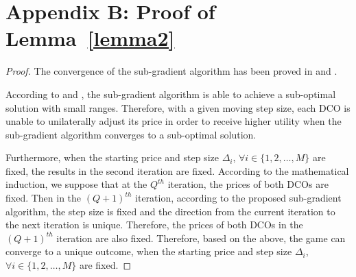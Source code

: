 \documentclass[twocolumn,10pt]{IEEEtran}
\newtheorem{proof}{Proof}
\begin{document}
\section*{Appendix B: Proof of Lemma~\ref{lemma2}}
\begin{proof}
The convergence of the sub-gradient algorithm has been proved in \cite{SPBoyd} and \cite{YXiao01}.

According to \cite{SPBoyd} and \cite{YXiao01}, the sub-gradient algorithm is able to achieve a sub-optimal solution with small ranges. Therefore, with a given moving step size, each DCO is unable to unilaterally adjust its price in order to receive higher utility when the sub-gradient algorithm converges to a sub-optimal solution.

Furthermore, when the starting price and step size $\Delta_i$, $\forall i \in \{1,2,\ldots,M\}$ are fixed, the results in the second iteration are fixed. According to the mathematical induction, we suppose that at the $Q^{th}$ iteration, the prices of both DCOs are fixed. Then in the $(Q+1)^{th}$ iteration, according to the proposed sub-gradient algorithm, the step size is fixed and the direction from the current iteration to the next iteration is unique. Therefore, the prices of both DCOs in the $(Q+1)^{th}$ iteration are also fixed. Therefore, based on the above, the game can converge to a unique outcome, when the starting price and step size $\Delta_i$, $\forall i \in \{1,2,\ldots,M\}$ are fixed. \end{proof}
\end{document}
